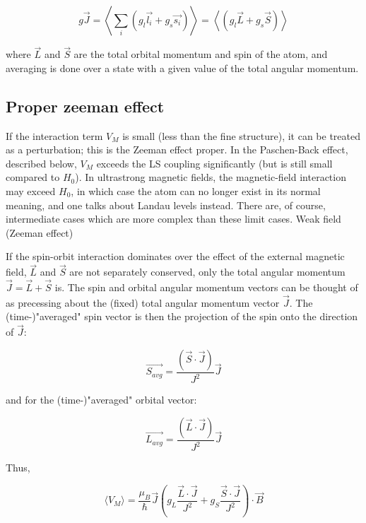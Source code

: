 \documentclass[main.tex]{subfiles}
\newcommand{\mblock}[1]{ {\allowbreak $#1$ }}
\begin{document}
\begin{equation*}
g \vec{J} = \left\langle\sum_i (g_l \vec{l_i} + g_s \vec{s_i})\right\rangle = \left\langle (g_l\vec{L} + g_s \vec{S})\right\rangle
\end{equation*}

where $\vec{L}$ and $\vec{S}$ are the total orbital momentum and spin of the atom, and averaging is done over a state with a given value of the total angular momentum.

\subsection{Proper zeeman effect}

If the interaction term $V_M$ is small (less than the fine structure), it can be treated as a perturbation; this is the Zeeman effect proper. In the Paschen-Back effect, described below, $V_M$ exceeds the LS coupling significantly (but is still small compared to $H_{0}$). In ultrastrong magnetic fields, the magnetic-field interaction may exceed $H_0$, in which case the atom can no longer exist in its normal meaning, and one talks about Landau levels instead. There are, of course, intermediate cases which are more complex than these limit cases.
Weak field (Zeeman effect)

If the spin-orbit interaction dominates over the effect of the external magnetic field, $\vec{L}$ and $\vec{S}$ are not separately conserved, only the total angular momentum \mblock{\vec{J}= \vec{L} + \vec{S}} is. The spin and orbital angular momentum vectors can be thought of as precessing about the (fixed) total angular momentum vector $\vec{J}$. The (time-)"averaged" spin vector is then the projection of the spin onto the direction of $\vec{J}$:

\begin{equation*}
\vec{S_{avg}} = \frac{(\vec{S} \cdot \vec{J})}{J^2} \vec{J}
\end{equation*}

and for the (time-)"averaged" orbital vector:

\begin{equation*}
    \vec{L_{avg}} = \frac{(\vec{L} \cdot \vec J)}{J^2} \vec{J}
\end{equation*}

Thus,

\begin{equation*}
\langle V_M \rangle = \frac{\mu_B}{\hbar} \vec{J}\left(g_L\frac{\vec{L} \cdot \vec{J}}{J^2} + g_S\frac{\vec{S} \cdot \vec{J}}{J^2}\right) \cdot \vec{B}
\end{equation*}
\end{document}
